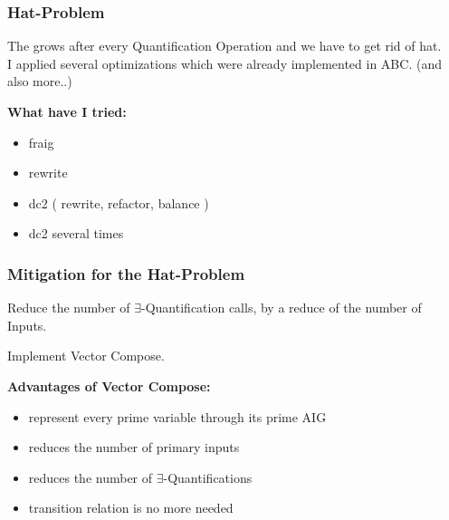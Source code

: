 \documentclass{beamer}
\begin{document}
\begin{frame}
\frametitle{Hat-Problem}

The grows after every Quantification Operation and we have to get rid
of hat.\\
I applied several optimizations which were already implemented in ABC.
(and also more..)

\bigskip

\textbf{What have I tried:} \\
\begin{itemize}[label={}]
\item<2-> fraig
\item<3-> rewrite
\item<4-> dc2 ( rewrite, refactor, balance )
\item<5-> dc2 several times
\end{itemize}

\bigskip

\end{frame}

\begin{frame}
\frametitle{Mitigation for the Hat-Problem}

Reduce the number of $\exists$-Quantification calls, by a reduce of
the number of Inputs.\\

\bigskip

Implement Vector Compose.

\bigskip

\textbf{Advantages of Vector Compose:}\\

\begin{itemize}

\item represent every prime variable through its prime AIG
\item reduces the number of primary inputs
\item reduces the number of $\exists$-Quantifications
\item transition relation is no more needed

\end{itemize}

\end{frame}
\end{document}
